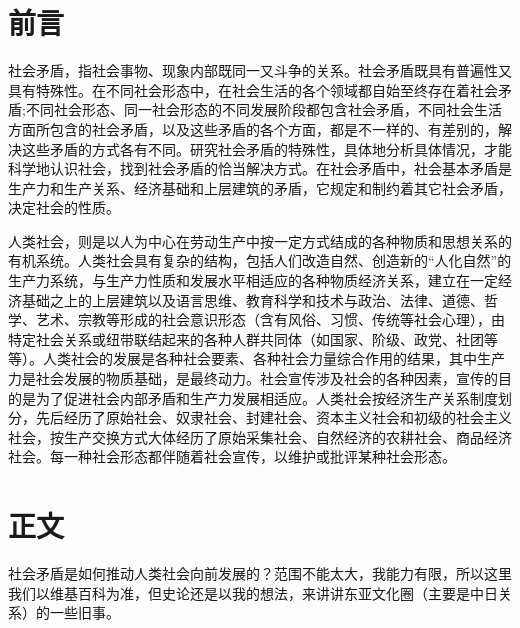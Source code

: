\section{前言}

社会矛盾，指社会事物、现象内部既同一又斗争的关系。社会矛盾既具有普遍性又具有特殊性。在不同社会形态中，在社会生活的各个领域都自始至终存在着社会矛盾;不同社会形态、同一社会形态的不同发展阶段都包含社会矛盾，不同社会生活方面所包含的社会矛盾，以及这些矛盾的各个方面，都是不一样的、有差别的，解决这些矛盾的方式各有不同。研究社会矛盾的特殊性，具体地分析具体情况，才能科学地认识社会，找到社会矛盾的恰当解决方式。在社会矛盾中，社会基本矛盾是生产力和生产关系、经济基础和上层建筑的矛盾，它规定和制约着其它社会矛盾，决定社会的性质。

人类社会，则是以人为中心在劳动生产中按一定方式结成的各种物质和思想关系的有机系统。人类社会具有复杂的结构，包括人们改造自然、创造新的“人化自然”的生产力系统，与生产力性质和发展水平相适应的各种物质经济关系，建立在一定经济基础之上的上层建筑以及语言思维、教育科学和技术与政治、法律、道德、哲学、艺术、宗教等形成的社会意识形态（含有风俗、习惯、传统等社会心理），由特定社会关系或纽带联结起来的各种人群共同体（如国家、阶级、政党、社团等等）。人类社会的发展是各种社会要素、各种社会力量综合作用的结果，其中生产力是社会发展的物质基础，是最终动力。社会宣传涉及社会的各种因素，宣传的目的是为了促进社会内部矛盾和生产力发展相适应。人类社会按经济生产关系制度划分，先后经历了原始社会、奴隶社会、封建社会、资本主义社会和初级的社会主义社会，按生产交换方式大体经历了原始采集社会、自然经济的农耕社会、商品经济社会。每一种社会形态都伴随着社会宣传，以维护或批评某种社会形态。

\section{正文}

社会矛盾是如何推动人类社会向前发展的？范围不能太大，我能力有限，所以这里我们以维基百科为准，但史论还是以我的想法，来讲讲东亚文化圈（主要是中日关系）的一些旧事。

